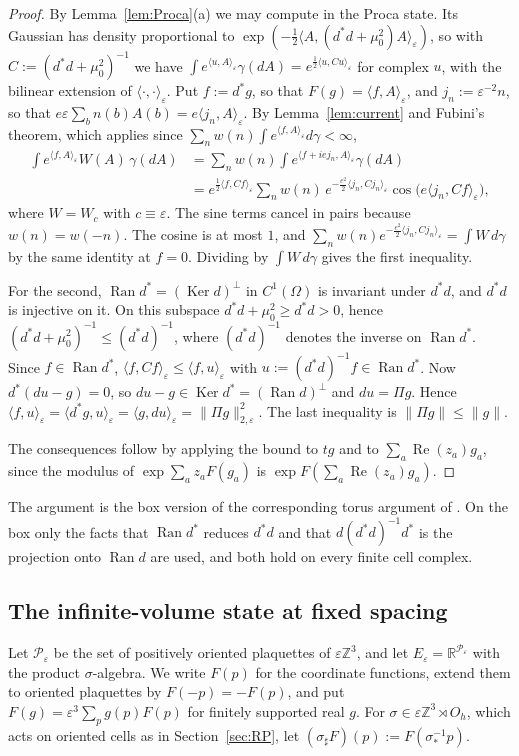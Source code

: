 \documentclass[11pt]{amsart}
\theoremstyle{plain}
\theoremstyle{definition}
\theoremstyle{remark}
\numberwithin{equation}{section}
\newcommand{\R}{\mathbb{R}}
\newcommand{\Z}{\mathbb{Z}}
\newcommand{\eps}{\varepsilon}
\newcommand{\cP}{\mathcal{P}}
\newcommand{\Oh}{O_h}
\newcommand{\norm}[1]{\lVert #1\rVert}
\newcommand{\ip}[2]{\langle #1,#2\rangle}
\newcommand{\Ran}{\operatorname{Ran}}
\newcommand{\Ker}{\operatorname{Ker}}
\DeclareMathOperator{\re}{Re}
\begin{document}
\begin{proof}
By Lemma~\ref{lem:Proca}(a) we may compute in the Proca state. Its Gaussian has density proportional to $\exp(-\frac12\ip A{(d^*d+\mu_0^2)A}_\eps)$, so with $C:=(d^*d+\mu_0^2)^{-1}$ we have $\int e^{\ip uA_\eps}\gamma(dA)=e^{\frac12\ip u{Cu}_\eps}$ for complex $u$, with the bilinear extension of $\ip\cdot\cdot_\eps$. Put $f:=d^*g$, so that $F(g)=\ip fA_\eps$, and $j_n:=\eps^{-2}n$, so that $e\eps\sum_bn(b)A(b)=e\ip{j_n}A_\eps$. By Lemma~\ref{lem:current} and Fubini's theorem, which applies since $\sum_nw(n)\int e^{\ip fA_\eps}d\gamma<\infty$,
\begin{align*}
\int e^{\ip fA_\eps}W(A)\,\gamma(dA)&=\sum_nw(n)\int e^{\ip{f+iej_n}A_\eps}\gamma(dA)\\
&=e^{\frac12\ip f{Cf}_\eps}\sum_nw(n)\,e^{-\frac{e^2}2\ip{j_n}{Cj_n}_\eps}\cos\big(e\ip{j_n}{Cf}_\eps\big),
\end{align*}
where $W=W_c$ with $c\equiv\eps$. The sine terms cancel in pairs because $w(n)=w(-n)$. The cosine is at most $1$, and $\sum_nw(n)e^{-\frac{e^2}2\ip{j_n}{Cj_n}_\eps}=\int W\,d\gamma$ by the same identity at $f=0$. Dividing by $\int W\,d\gamma$ gives the first inequality.

For the second, $\Ran d^*=(\Ker d)^\perp$ in $C^1(\Omega)$ is invariant under $d^*d$, and $d^*d$ is injective on it. On this subspace $d^*d+\mu_0^2\ge d^*d>0$, hence $(d^*d+\mu_0^2)^{-1}\le(d^*d)^{-1}$, where $(d^*d)^{-1}$ denotes the inverse on $\Ran d^*$. Since $f\in\Ran d^*$, $\ip f{Cf}_\eps\le\ip f{u}_\eps$ with $u:=(d^*d)^{-1}f\in\Ran d^*$. Now $d^*(du-g)=0$, so $du-g\in\Ker d^*=(\Ran d)^\perp$ and $du=\Pi g$. Hence $\ip fu_\eps=\ip{d^*g}u_\eps=\ip g{du}_\eps=\norm{\Pi g}_{2,\eps}^2$. The last inequality is $\norm{\Pi g}\le\norm g$.

The consequences follow by applying the bound to $tg$ and to $\sum_a\re(z_a)g_a$, since the modulus of $\exp\sum_az_aF(g_a)$ is $\exp F(\sum_a\re(z_a)g_a)$.
\end{proof}

The argument is the box version of the corresponding torus argument of \cite[Lemma~7.3]{v1}. On the box only the facts that $\Ran d^*$ reduces $d^*d$ and that $d(d^*d)^{-1}d^*$ is the projection onto $\Ran d$ are used, and both hold on every finite cell complex.

\subsection{The infinite-volume state at fixed spacing}
Let $\cP_\eps$ be the set of positively oriented plaquettes of $\eps\Z^3$, and let $E_\eps=\R^{\cP_\eps}$ with the product $\sigma$-algebra. We write $F(p)$ for the coordinate functions, extend them to oriented plaquettes by $F(-p)=-F(p)$, and put $F(g)=\eps^3\sum_pg(p)F(p)$ for finitely supported real $g$. For $\sigma\in\eps\Z^3\rtimes\Oh$, which acts on oriented cells as in Section~\ref{sec:RP}, let $(\sigma_\sharp F)(p):=F(\sigma^{-1}_*p)$.
\end{document}
